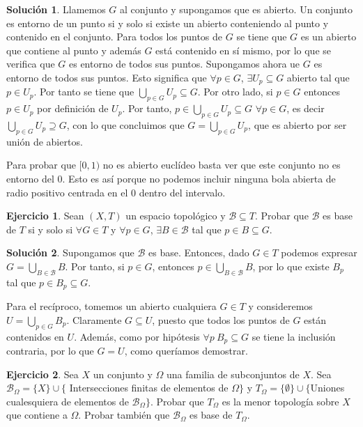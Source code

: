 \documentclass{article}
\theoremstyle{plain}
\theoremstyle{definition}
\newtheorem{exercise}{Ejercicio}
\newtheorem*{sol*}{Solución}
\begin{document}
\begin{sol*}
Llamemos $G$ al conjunto y supongamos que es abierto. Un conjunto es entorno de un punto si y solo si existe un abierto conteniendo al punto y contenido en el conjunto. Para todos los puntos de $G$ se tiene que $G$ es un abierto que contiene al punto y además $G$ está contenido en sí mismo, por lo que se verifica que $G$ es entorno de todos sus puntos. Supongamos ahora ue $G$ es entorno de todos sus puntos. Esto significa que $\forall p\in G$, $\exists U_p\subseteq G$ abierto tal que $p\in U_p$. Por tanto se tiene que $\bigcup_{p\in G} U_p\subseteq G$. Por otro lado, si $p\in G$ entonces $p\in U_p$ por definición de $U_p$. Por tanto, $p\in \bigcup_{p\in G} U_p\subseteq G$ $\forall p\in G$, es decir $\bigcup_{p\in G} U_p\supseteq G$, con lo que concluimos que $G=\bigcup_{p\in G} U_p$, que es abierto por ser unión de abiertos.

Para probar que $[0,1)$ no es abierto euclídeo basta ver que este conjunto no es entorno del $0$. Esto es así porque no podemos incluir ninguna bola abierta de radio positivo centrada en el $0$ dentro del intervalo.
\end{sol*}

\begin{exercise}
Sean $(X,T)$ un espacio topológico y $\mathcal{B}\subseteq T$. Probar que $\mathcal{B}$ es base de $T$ si y solo si $\forall G\in T$ y $\forall p\in G$, $\exists B\in\mathcal{B}$ tal que $p\in B\subseteq G$. 
\end{exercise}

\begin{sol*}
Supongamos que $\mathcal{B}$ es base. Entonces, dado $G\in T$ podemos expresar $G=\bigcup_{B\in\mathcal{B}} B$. Por tanto, si $p\in G$, entonces $p\in\bigcup_{B\in\mathcal{B}}B$, por lo que existe $B_p$ tal que $p\in B_p\subseteq G$. 

Para el recíproco, tomemos un abierto cualquiera $G\in T$ y consideremos $U=\bigcup_{p\in G} B_p$. Claramente $G\subseteq U$, puesto que todos los puntos de $G$ están contenidos en $U$. Además, como por hipótesis $\forall p\ B_p\subseteq G$ se tiene la inclusión contraria, por lo que $G=U$, como queríamos demostrar.
\end{sol*}

\begin{exercise}
Sea $X$ un conjunto y $\Omega$ una familia de subconjuntos de $X$. Sea $\mathcal{B}_\Omega=\{X\}\cup\{$ Intersecciones finitas de elementos de $\Omega\}$ y $T_\Omega=\{\emptyset\}\cup\{$Uniones cualesquiera de elementos de $\mathcal{B}_\Omega\}$. Probar que $T_\Omega$ es la menor topología sobre $X$ que contiene a $\Omega$. Probar también que $\mathcal{B}_\Omega$ es base de $T_\Omega$.
\end{exercise}
\end{document}
